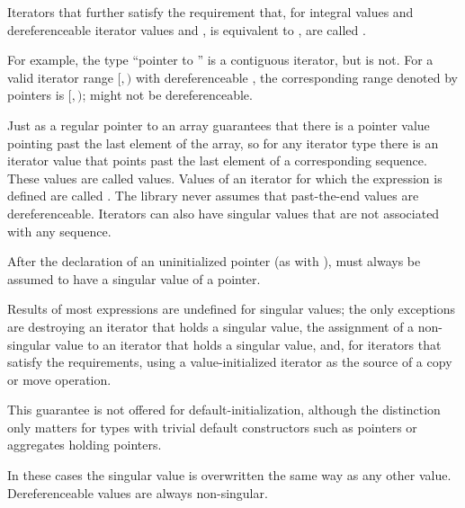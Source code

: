 \pnum
Iterators that further satisfy the requirement that,
for integral values  and
dereferenceable iterator values  and ,
 is equivalent to ,
are called .
\begin{note}
For example, the type ``pointer to '' is a contiguous iterator,
but  is not.
For a valid iterator range $[$$, $$)$ with dereferenceable ,
the corresponding range denoted by pointers is
$[$$, $$)$;
 might not be dereferenceable.
\end{note}

\pnum
Just as a regular pointer to an array guarantees that there is a pointer value pointing past the last element
of the array, so for any iterator type there is an iterator value that points past the last element of a
corresponding sequence.
These values are called
values.
Values of an iterator
for which the expression
is defined are called
.
The library never assumes that past-the-end values are dereferenceable.
Iterators can also have singular values that are not associated with any
sequence.
\begin{example}
After the declaration of an uninitialized pointer
(as with
),
must always be assumed to have a singular value of a pointer.
\end{example}
Results of most expressions are undefined for singular values;
the only exceptions are destroying an iterator that holds a singular value,
the assignment of a non-singular value to
an iterator that holds a singular value, and, for iterators that satisfy the
 requirements, using a value-initialized iterator
as the source of a copy or move operation. \begin{note} This guarantee is not
offered for default-initialization, although the distinction only matters for types
with trivial default constructors such as pointers or aggregates holding pointers.
\end{note}
In these cases the singular
value is overwritten the same way as any other value.
Dereferenceable
values are always non-singular.

